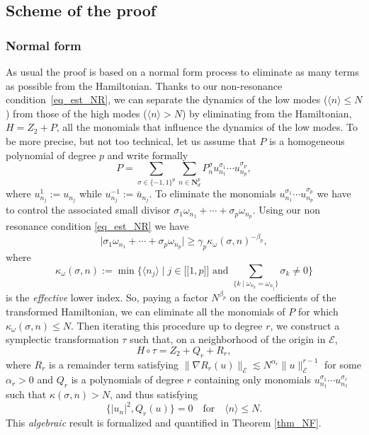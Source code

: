 \documentclass[11pt]{article}
\newcommand{\Subsection}{\subsection}
\let\ts\textstyle
\newcommand{\llbracket}{\mathopen{[\!\![}}
\newcommand{\rrbracket}{\mathclose{]\!\!]}}
\theoremstyle{definition}
\begin{document}
\Subsection{Scheme of the proof}
\label{subsec_scheme}

\subsubsection*{Normal form} As usual the proof is based on a normal form process to eliminate as many terms as possible from the Hamiltonian. Thanks to our non-resonance condition~\eqref{eq_est_NR}, we can separate the dynamics of the low modes ($\langle n\rangle\leq N$) from those of the high modes ($\langle n\rangle> N$)
by eliminating from the Hamiltonian, $H=Z_2+P$, all the monomials that influence the dynamics of the low modes. To be more precise, but not too technical, let us assume that $P$ is a homogeneous polynomial of degree $p$ and write formally
\[
P=\sum_{\sigma\in\{-1,1\}^p}\sum_{n\in \mathbf{N}^p_d } P^\sigma_n u_{n_1}^{\sigma_1}\cdots u_{n_p}^{\sigma_p},
\]
where $u_{n_j}^{1}:=u_{n_j}$ while $u_{n_j}^{-1}:=\bar u_{n_j}$.
To eliminate the monomials $u_{n_1}^{\sigma_1}\cdots u_{n_p}^{\sigma_p}$ we have to control the associated small divisor
$\sigma_1 \omega_{n_1}+\cdots+\sigma_p \omega_{n_p}$.
Using our non resonance condition \eqref{eq_est_NR} we have
\[
\big| \sigma_1 \omega_{n_1}+\cdots+\sigma_p \omega_{n_p}\big|\geq \gamma_p\kappa_\omega(\sigma,n)^{-\beta_p},
\]
where
\begin{equation}
\label{eq_def_kappa}
\kappa_\omega(\sigma,n):= \min \big\{\langle n_j \rangle \mid j \in \llbracket 1,p \rrbracket \text{ and } \ts\sum_{\{k\mid \omega_{n_k} = \omega_{n_j}\}} \sigma_k \neq 0\big\}
\end{equation}
is the \emph{effective} lower index.
So, paying a factor $N^{\beta_p}$ on the coefficients of the transformed Hamiltonian, we can eliminate all the monomials of $P$ for which $\kappa_\omega(\sigma,n)\leq N$. Then iterating this procedure up to degree $r$, we construct a symplectic transformation $\tau$ such that, on a neighborhood of the origin in ${\mathcal{E}}$,
\[
H\circ \tau =Z_2+Q_r+R_r,
\]
where $R_r$ is a remainder term satisfying $\|\nabla R_r(u)\|_{\mathcal{E}}\lesssim N^{\alpha_r}\|u\|^{r-1}_{\mathcal{E}}$ for some $\alpha_r>0$ and $Q_r$ is a polynomials of degree $r$ containing only monomials $ u_{n_1}^{\sigma_1}\cdots u_{n_\ell}^{\sigma_\ell}$ such that $\kappa(\sigma,n)> N$, and thus satisfying
\[
\{|u_n|^2,Q_r(u)\}=0
\quad \mathrm{for} \quad
\langle n \rangle \leq N.
\]
This \emph{algebraic} result is formalized and quantified in Theorem \ref{thm_NF}.
\end{document}
